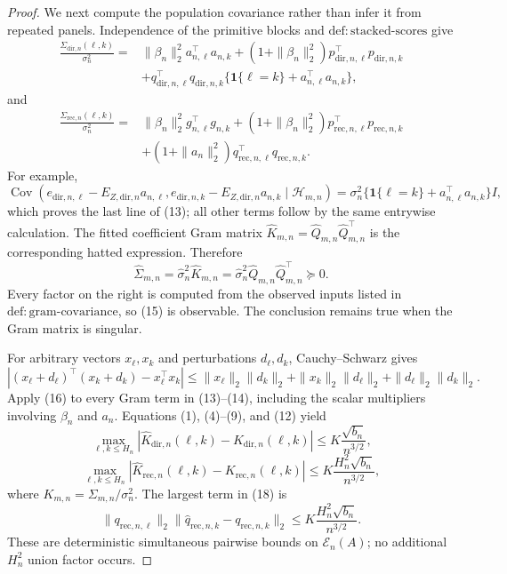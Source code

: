 \documentclass{article}
\begin{document}
\begin{proof}
We next compute the population covariance rather than infer it from repeated panels.  Independence of the primitive blocks and \(\mathrm{def{:}stacked\mbox{-}scores}\) give
\[
\begin{aligned}
 \frac{\Sigma_{\mathrm{dir},n}(\ell,k)}{\sigma_n^2}
={}&\|\beta_n\|_2^2a_{n,\ell}^\top a_{n,k}
 +(1+\|\beta_n\|_2^2)p_{\mathrm{dir},n,\ell}^\top p_{\mathrm{dir},n,k}\\
 &+q_{\mathrm{dir},n,\ell}^\top q_{\mathrm{dir},n,k}
   \{\mathbf 1\{\ell=k\}+a_{n,\ell}^\top a_{n,k}\},
\end{aligned}
 \tag{13}
\]
and
\[
\begin{aligned}
 \frac{\Sigma_{\mathrm{rec},n}(\ell,k)}{\sigma_n^2}
={}&\|\beta_n\|_2^2g_{n,\ell}^\top g_{n,k}
 +(1+\|\beta_n\|_2^2)p_{\mathrm{rec},n,\ell}^\top p_{\mathrm{rec},n,k}\\
 &+(1+\|a_n\|_2^2)q_{\mathrm{rec},n,\ell}^\top q_{\mathrm{rec},n,k}.
\end{aligned}
 \tag{14}
\]
For example,
\[
 \operatorname{Cov}(e_{\mathrm{dir},n,\ell}-E_{Z,\mathrm{dir},n}a_{n,\ell},
 e_{\mathrm{dir},n,k}-E_{Z,\mathrm{dir},n}a_{n,k}\mid\mathcal H_{m,n})
 =\sigma_n^2\{\mathbf1\{\ell=k\}+a_{n,\ell}^\top a_{n,k}\}I,
\]
which proves the last line of (13); all other terms follow by the same entrywise calculation.  The fitted coefficient Gram matrix \(\widehat K_{m,n}=\widehat Q_{m,n}\widehat Q_{m,n}^\top\) is the corresponding hatted expression.  Therefore
\[
 \widehat\Sigma_{m,n}=\widehat\sigma_n^2\widehat K_{m,n}
 =\widehat\sigma_n^2\widehat Q_{m,n}\widehat Q_{m,n}^\top\succeq0.
 \tag{15}
\]
Every factor on the right is computed from the observed inputs listed in
\(\mathrm{def{:}gram\mbox{-}covariance}\), so (15) is observable.  The conclusion remains true when the Gram matrix is singular.

For arbitrary vectors \(x_\ell,x_k\) and perturbations \(d_\ell,d_k\), Cauchy--Schwarz gives
\[
 |(x_\ell+d_\ell)^\top(x_k+d_k)-x_\ell^\top x_k|
 \le\|x_\ell\|_2\|d_k\|_2+
      \|x_k\|_2\|d_\ell\|_2+
      \|d_\ell\|_2\|d_k\|_2.
 \tag{16}
\]
Apply (16) to every Gram term in (13)--(14), including the scalar multipliers involving \(\beta_n\) and \(a_n\).  Equations (1), (4)--(9), and (12) yield
\[
 \max_{\ell,k\le H_n}
 |\widehat K_{\mathrm{dir},n}(\ell,k)-K_{\mathrm{dir},n}(\ell,k)|
 \le K\frac{\sqrt{b_n}}{n^{3/2}},
 \tag{17}
\]
\[
 \max_{\ell,k\le H_n}
 |\widehat K_{\mathrm{rec},n}(\ell,k)-K_{\mathrm{rec},n}(\ell,k)|
 \le K\frac{H_n^2\sqrt{b_n}}{n^{3/2}},
 \tag{18}
\]
where \(K_{m,n}=\Sigma_{m,n}/\sigma_n^2\).  The largest term in (18) is
\[
 \|q_{\mathrm{rec},n,\ell}\|_2
 \|\widehat q_{\mathrm{rec},n,k}-q_{\mathrm{rec},n,k}\|_2
 \le K\frac{H_n^2\sqrt{b_n}}{n^{3/2}}.
\]
These are deterministic simultaneous pairwise bounds on \(\mathcal E_n(A)\); no additional \(H_n^2\) union factor occurs.


\end{proof}
\end{document}
